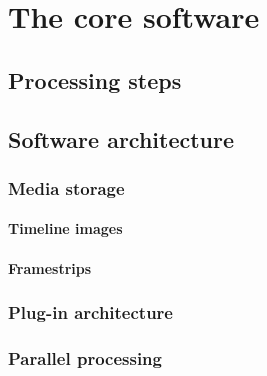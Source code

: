 \chapter{The core software}\label{chap:Core software}
\section{Processing steps}

\section{Software architecture}
\subsection{Media storage}
\subsubsection{Timeline images}
\subsubsection{Framestrips}

\subsection{Plug-in architecture}
\subsection{Parallel processing}





